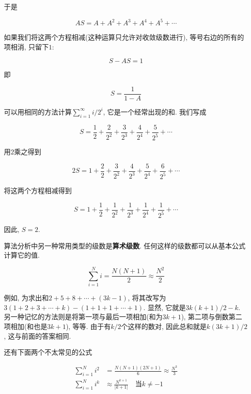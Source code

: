 \documentclass[oneside]{ctexbook}
\begin{document}
于是

\begin{equation*}
    AS=A+A^2+A^3+A^4+A^5+\cdots
\end{equation*}

如果我们将这两个方程相减(这种运算只允许对收敛级数进行), 等号右边的所有的项相消, 只留下$1$:

\begin{equation*}
    S-AS=1
\end{equation*}

即

\begin{equation*}
    S=\frac{1}{1-A}
\end{equation*}

可以用相同的方法计算$\sum_{i=1}^{\infty}i/2^i$, 它是一个经常出现的和. 我们写成

\begin{equation*}
    S=\frac{1}{2}+\frac{2}{2^2}+\frac{3}{2^3}+\frac{4}{2^4}+\frac{5}{2^5}+\cdots
\end{equation*}

用$2$乘之得到

\begin{equation*}
    2S=1+\frac{2}{2}+\frac{3}{2^2}+\frac{4}{2^3}+\frac{5}{2^4}+\frac{6}{2^5}+\cdots
\end{equation*}

将这两个方程相减得到

\begin{equation*}
    S=1+\frac{1}{2}+\frac{1}{2^2}+\frac{1}{2^3}+\frac{1}{2^4}+\frac{1}{2^5}+\cdots
\end{equation*}

因此, $S=2$.

算法分析中另一种常用类型的级数是\textbf{算术级数}. 任何这样的级数都可以从基本公式计算它的值.

\begin{equation*}
    \sum_{i=1}^{N}i=\frac{N(N+1)}{2}\approx\frac{N^2}{2}
\end{equation*}

例如, 为求出和$2+5+8+\cdots+(3k-1)$, 将其改写为$3(1+2+3+\cdots+k)-(1+1+1+\cdots+1)$. 显然, 它就是$3k(k+1)/2-k$. 另一种记忆的方法则是将第一项与最后一项相加(和为$3k+1$), 第二项与倒数第二项相加(和也是$3k+1$), 等等. 由于有$k/2$个这样的数对, 因此总和就是$k(3k+1)/2$, 这与前面的答案相同.

还有下面两个不太常见的公式

\begin{equation*}
    \begin{split}
        \sum_{i=1}^{N}i^2 &= \frac{N(N+1)(2N+1)}{6}\approx\frac{N^3}{3} \\
        \sum_{i=1}^{N}i^k &\approx\frac{N^{k+1}}{|k+1|}\quad\text{当}k\ne -1 
    \end{split}
\end{equation*}
\end{document}
